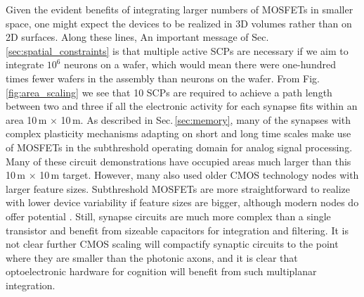 \documentclass[twocolumn]{article}
\begin{document}
Given the evident benefits of integrating larger numbers of MOSFETs in smaller space, one might expect the devices to be realized in 3D volumes rather than on 2D surfaces. Along these lines, An important message of Sec.\,\ref{sec:spatial_constraints} is that multiple active SCPs are necessary if we aim to integrate $10^6$ neurons on a wafer, which would mean there were one-hundred times fewer wafers in the assembly than neurons on the wafer. From Fig.\,\ref{fig:area_scaling} we see that 10 SCPs are required to achieve a path length between two and three if all the electronic activity for each synapse fits within an area 10\,\textmu m $\times$ 10\,\textmu m. As described in Sec.\,\ref{sec:memory}, many of the synapses with complex plasticity mechanisms adapting on short and long time scales make use of MOSFETs in the subthreshold operating domain for analog signal processing. Many of these circuit demonstrations have occupied areas much larger than this 10\,\textmu m $\times$ 10\,\textmu m target. However, many also used older CMOS technology nodes with larger feature sizes. Subthreshold MOSFETs are more straightforward to realize with lower device variability if feature sizes are bigger, although modern nodes do offer potential \cite{}. Still, synapse circuits are much more complex than a single transistor and benefit from sizeable capacitors for integration and filtering. It is not clear further CMOS scaling will compactify synaptic circuits to the point where they are smaller than the photonic axons, and it is clear that optoelectronic hardware for cognition will benefit from such multiplanar integration.
\end{document}
